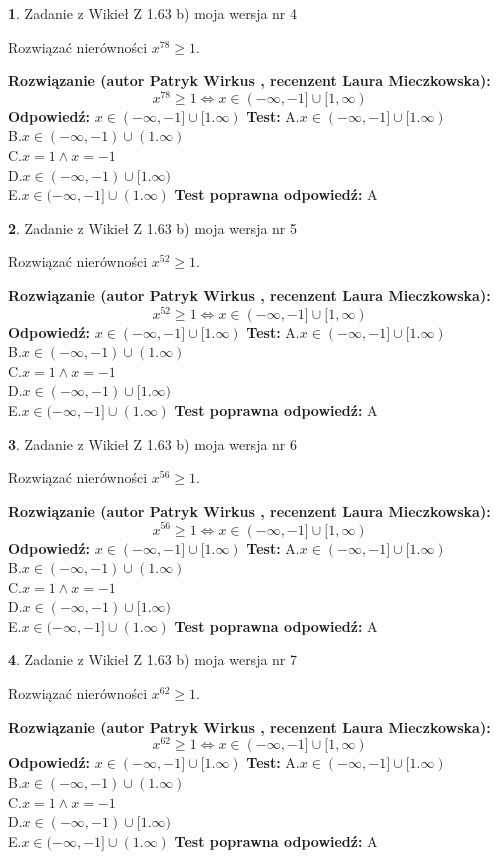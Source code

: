 \documentclass[12pt, a4paper]{article}
\theoremstyle{definition} %
\newtheorem{zad}{}
\newcommand{\zadStart}[1]{\begin{zad}#1\newline}
\newcommand{\zadStop}{\end{zad}}
\newcommand{\rozwStart}[2]{\noindent \textbf{Rozwiązanie (autor #1 , recenzent #2): }\newline}
\newcommand{\rozwStop}{\newline}
\newcommand{\odpStart}{\noindent \textbf{Odpowiedź:}\newline}
\newcommand{\odpStop}{\newline}
\newcommand{\testStart}{\noindent \textbf{Test:}\newline}
\newcommand{\testStop}{\newline}
\newcommand{\kluczStart}{\noindent \textbf{Test poprawna odpowiedź:}\newline}
\newcommand{\kluczStop}{\newline}
\begin{document}
\zadStart{Zadanie z Wikieł Z 1.63 b) moja wersja nr 4}

Rozwiązać nierówności $x^{78} \ge 1$.
\zadStop
\rozwStart{Patryk Wirkus}{Laura Mieczkowska}
$$x^{78} \ge 1 \iff x \in (-\infty,-1] \cup [1,\infty)$$
\rozwStop
\odpStart
$x \in (-\infty,-1] \cup [1.\infty)$
\odpStop
\testStart
A.$x \in (-\infty,-1] \cup [1.\infty)$\\ B.$x \in (-\infty,-1) \cup (1.\infty)$\\ C.$x = 1 \wedge x = -1$\\ D.$x \in (-\infty,-1) \cup [1.\infty)$\\ E.$x \in (-\infty,-1] \cup (1.\infty)$
\testStop
\kluczStart
A
\kluczStop



\zadStart{Zadanie z Wikieł Z 1.63 b) moja wersja nr 5}

Rozwiązać nierówności $x^{52} \ge 1$.
\zadStop
\rozwStart{Patryk Wirkus}{Laura Mieczkowska}
$$x^{52} \ge 1 \iff x \in (-\infty,-1] \cup [1,\infty)$$
\rozwStop
\odpStart
$x \in (-\infty,-1] \cup [1.\infty)$
\odpStop
\testStart
A.$x \in (-\infty,-1] \cup [1.\infty)$\\ B.$x \in (-\infty,-1) \cup (1.\infty)$\\ C.$x = 1 \wedge x = -1$\\ D.$x \in (-\infty,-1) \cup [1.\infty)$\\ E.$x \in (-\infty,-1] \cup (1.\infty)$
\testStop
\kluczStart
A
\kluczStop



\zadStart{Zadanie z Wikieł Z 1.63 b) moja wersja nr 6}

Rozwiązać nierówności $x^{56} \ge 1$.
\zadStop
\rozwStart{Patryk Wirkus}{Laura Mieczkowska}
$$x^{56} \ge 1 \iff x \in (-\infty,-1] \cup [1,\infty)$$
\rozwStop
\odpStart
$x \in (-\infty,-1] \cup [1.\infty)$
\odpStop
\testStart
A.$x \in (-\infty,-1] \cup [1.\infty)$\\ B.$x \in (-\infty,-1) \cup (1.\infty)$\\ C.$x = 1 \wedge x = -1$\\ D.$x \in (-\infty,-1) \cup [1.\infty)$\\ E.$x \in (-\infty,-1] \cup (1.\infty)$
\testStop
\kluczStart
A
\kluczStop



\zadStart{Zadanie z Wikieł Z 1.63 b) moja wersja nr 7}

Rozwiązać nierówności $x^{62} \ge 1$.
\zadStop
\rozwStart{Patryk Wirkus}{Laura Mieczkowska}
$$x^{62} \ge 1 \iff x \in (-\infty,-1] \cup [1,\infty)$$
\rozwStop
\odpStart
$x \in (-\infty,-1] \cup [1.\infty)$
\odpStop
\testStart
A.$x \in (-\infty,-1] \cup [1.\infty)$\\ B.$x \in (-\infty,-1) \cup (1.\infty)$\\ C.$x = 1 \wedge x = -1$\\ D.$x \in (-\infty,-1) \cup [1.\infty)$\\ E.$x \in (-\infty,-1] \cup (1.\infty)$
\testStop
\kluczStart
A
\kluczStop
\end{document}
